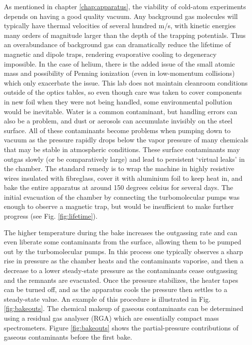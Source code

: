 		As mentioned in chapter \ref{chap:apparatus}, the viability of cold-atom experiments depends on having a good quality vacuum.
		Any background gas molecules will typically have thermal velocities of several hundred m/s, with kinetic energies many orders of magnitude larger than the depth of the trapping potentials.
		Thus an overabundance of background gas can dramatically reduce the lifetime of magnetic and dipole traps, rendering evaporative cooling to degeneracy impossible.
		In the case of helium, there is the added issue of the small atomic mass and possibility of Penning ionization (even in low-momentum collisions) which only exacerbate the issue.
		This lab does not maintain cleanroom conditions outside of the optics tables, so even though care was taken to cover components in new foil when they were not being handled, some environmental pollution would be inevitable.
		Water is a common contaminant, but handling errors can also be a problem, and dust or aerosols can accumulate invisibly on the steel surface.
		All of these contaminants become problems when pumping down to vacuum as the pressure rapidly drops below the vapor pressure of many chemicals that may be stable in atmospheric conditions.
		These surface contaminants may outgas slowly (or be comparatively large) and lead to persistent `virtual leaks' in the chamber.
		The standard remedy is to wrap the machine in highly resistive wires insulated with fibreglass, cover it with aluminium foil to keep heat in, and bake the entire apparatus at around 150 degrees celsius for several days.
		The initial evacuation of the chamber by connecting the turbomolecular pumps was enough to observe a magnetic trap, but would be insufficient to make further progress (see Fig. \ref{fig:lifetime}).



		The higher temperature during the bake increases the outgassing rate and can even liberate some contaminants from the surface, allowing them to be pumped out by the turbomolecular pumps.
		In this process one typically observes a sharp rise in pressure as the chamber heats and the contaminants vaporise, and then a decrease to a lower steady-state pressure as the contaminants cease outgassing and the remnants are evacuated.
		Once the pressure stabilizes, the heater tapes can be turned off, and as the apparatus cools the pressure then settles to a steady-state value.
		An example of this procedure is illustrated in Fig.	\ref{fig:bakeouts}.
		The chemical makeup of gaseous contaminants can be determined using a residual gas analyser (RGA) which are essentially compact mass spectrometers.
		Figure \ref{fig:bakeouts} shows the partial-pressure contributions of gaseous contaminants before the first bake.
		
